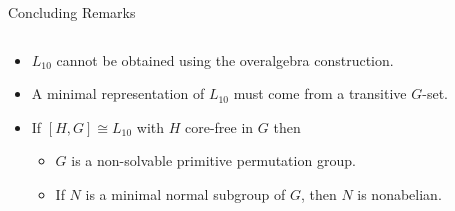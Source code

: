 \documentclass[xcolor=dvipsnames,9pt]{beamer}
\newcommand{\<}{\langle}	     %
\renewcommand{\>}{\rangle}	     %
\begin{document}
\begin{frame}[fragile,label=Conclusion,shrink=5]{Concluding Remarks}
  \begin{columns}
    \begin{column}{0.7\textwidth}
      \begin{itemize}
      \item  $L_{10}$ cannot be obtained using the overalgebra construction.
        \vskip3mm
      \item<2-> A minimal representation of $L_{10}$ must come from a transitive $G$-set.
        \vskip3mm
      \item<3-> If $[H,G]\cong L_{10}$ with $H$ core-free in $G$ then
        \vskip2mm
        \begin{itemize}
        \item $G$ is a non-solvable primitive permutation group.
          \vskip2mm
        \item If $N$ is a minimal normal subgroup of $G$, then $N$ is nonabelian.
        \end{itemize}
      \end{itemize}
    \end{column}
    \begin{column}{0.2\textwidth}
      \begin{center}
      \end{center}
\vskip5mm 
    \end{column}
  \end{columns}
\end{frame}
\end{document}
